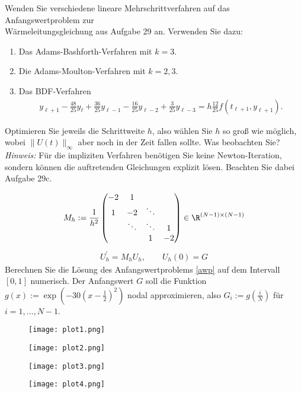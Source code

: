 \begin{exercise}
Wenden Sie verschiedene lineare Mehrschrittverfahren auf das Anfangswertproblem zur\\
Wärmeleitungsgleichung aus Aufgabe 29 an. Verwenden Sie dazu:
\begin{enumerate}[label = \textbf{\alph*)}]
  \item Das Adams-Bashforth-Verfahren mit $k = 3$.
  \item Die Adams-Moulton-Verfahren mit $k = 2,3$.
  \item Das BDF-Verfahren
  \begin{align*}
    y_{\ell + 1} - \frac{48}{25}y_{\ell} + \frac{36}{25}y_{\ell - 1} - \frac{16}{25}y_{\ell - 2}
    + \frac{3}{25}y_{\ell - 3} = h\frac{12}{25}f(t_{\ell + 1},y_{\ell + 1}).
  \end{align*}
\end{enumerate}
Optimieren Sie jeweils die Schrittweite $h$, also wählen Sie $h$ so groß wie möglich,
wobei $\|U(t)\|_{\infty}$ aber noch in der Zeit fallen sollte. Was beobachten Sie? \\
\textit{Hinweis:} Für die impliziten Verfahren benötigen Sie keine Newton-Iteration,
sondern können die auftretenden Gleichungen explizit lösen. Beachten Sie dabei Aufgabe 29c.
\end{exercise}
\begin{solution}
\begin{align}
  M_h := \frac{1}{h^2}\begin{pmatrix}
    -2 & 1 & &  \\
    1 & -2 & \ddots & \\
    & \ddots & \ddots & 1 \\
    & & 1 & -2
  \end{pmatrix}
  \in \R^{(N-1)\times (N-1)}
\end{align}
\begin{align}\label{awp}
  U_h^{\prime} = M_hU_h, \qquad U_h(0) = G
\end{align}
Berechnen Sie die Lösung des Anfangswertproblems \eqref{awp} auf dem Intervall
$[0,1]$ numerisch. Der Anfangswert $G$ soll die Funktion
$g(x) := \exp\left(-30\left(x-\frac{1}{2}\right)^2\right)$ nodal approximieren, also
$G_i := g\left(\frac{i}{N}\right)$ für $i = 1,\dots,N-1$.
\FloatBarrier
\begin{figure}
    \centering
    \texttt{[image: plot1.png]}
\end{figure}
\begin{figure}
    \centering
    \texttt{[image: plot2.png]}
\end{figure}
\begin{figure}
    \centering
    \texttt{[image: plot3.png]}
\end{figure}
\begin{figure}
    \centering
    \texttt{[image: plot4.png]}
\end{figure}
\end{solution}
